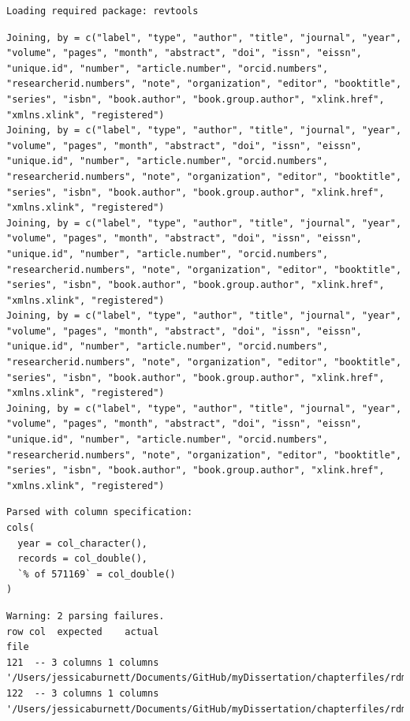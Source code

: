 \documentclass[12pt,twoside,openany]{reedthesis}
\begin{document}
\begin{verbatim}
Loading required package: revtools
\end{verbatim}
\begin{verbatim}
Joining, by = c("label", "type", "author", "title", "journal", "year", "volume", "pages", "month", "abstract", "doi", "issn", "eissn", "unique.id", "number", "article.number", "orcid.numbers", "researcherid.numbers", "note", "organization", "editor", "booktitle", "series", "isbn", "book.author", "book.group.author", "xlink.href", "xmlns.xlink", "registered")
Joining, by = c("label", "type", "author", "title", "journal", "year", "volume", "pages", "month", "abstract", "doi", "issn", "eissn", "unique.id", "number", "article.number", "orcid.numbers", "researcherid.numbers", "note", "organization", "editor", "booktitle", "series", "isbn", "book.author", "book.group.author", "xlink.href", "xmlns.xlink", "registered")
Joining, by = c("label", "type", "author", "title", "journal", "year", "volume", "pages", "month", "abstract", "doi", "issn", "eissn", "unique.id", "number", "article.number", "orcid.numbers", "researcherid.numbers", "note", "organization", "editor", "booktitle", "series", "isbn", "book.author", "book.group.author", "xlink.href", "xmlns.xlink", "registered")
Joining, by = c("label", "type", "author", "title", "journal", "year", "volume", "pages", "month", "abstract", "doi", "issn", "eissn", "unique.id", "number", "article.number", "orcid.numbers", "researcherid.numbers", "note", "organization", "editor", "booktitle", "series", "isbn", "book.author", "book.group.author", "xlink.href", "xmlns.xlink", "registered")
Joining, by = c("label", "type", "author", "title", "journal", "year", "volume", "pages", "month", "abstract", "doi", "issn", "eissn", "unique.id", "number", "article.number", "orcid.numbers", "researcherid.numbers", "note", "organization", "editor", "booktitle", "series", "isbn", "book.author", "book.group.author", "xlink.href", "xmlns.xlink", "registered")
\end{verbatim}
\begin{verbatim}
Parsed with column specification:
cols(
  year = col_character(),
  records = col_double(),
  `% of 571169` = col_double()
)
\end{verbatim}
\begin{verbatim}
Warning: 2 parsing failures.
row col  expected    actual                                                                                                                                  file
121  -- 3 columns 1 columns '/Users/jessicaburnett/Documents/GitHub/myDissertation/chapterfiles/rdmReview/wosSearchResults_20190310/numPubsByYear_allEcology.txt'
122  -- 3 columns 1 columns '/Users/jessicaburnett/Documents/GitHub/myDissertation/chapterfiles/rdmReview/wosSearchResults_20190310/numPubsByYear_allEcology.txt'
\end{verbatim}
\end{document}
